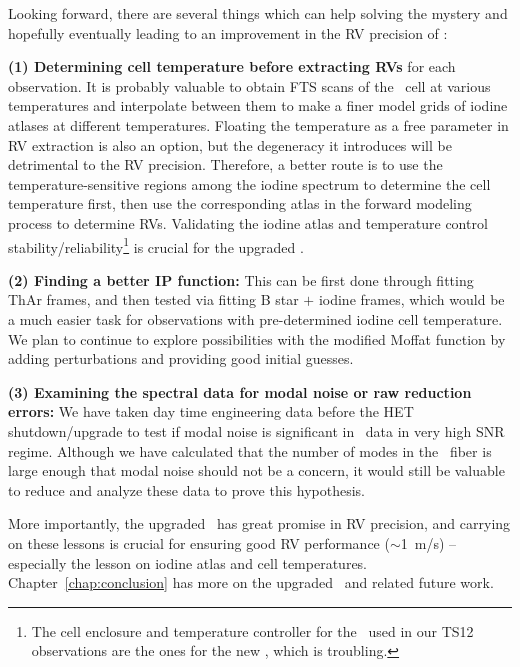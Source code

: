 Looking forward, there are several things which can help solving the
mystery and hopefully eventually leading to an improvement in the RV
precision of \het:

{\bf (1) Determining cell temperature before extracting RVs} for each
observation. It is probably valuable to obtain FTS scans of the \het\
cell at various temperatures and interpolate between them to make a
finer model grids of iodine atlases at different
temperatures. Floating the temperature as a free parameter in RV
extraction is also an option, but the degeneracy it introduces will be
detrimental to the RV precision. Therefore, a better route is to use
the temperature-sensitive regions among the iodine spectrum to
determine the cell temperature first, then use the corresponding atlas
in the forward modeling process to determine RVs. Validating the
iodine atlas and temperature control
stability/reliability\footnote{The cell enclosure and temperature
controller for the \het\ used in our TS12 observations are the ones
for the new \het, which is troubling.} is crucial for the upgraded
\het.

{\bf (2) Finding a better IP function:} This can be first done through
fitting ThAr frames, and then tested via fitting B star $+$ iodine
frames, which would be a much easier task for observations with
pre-determined iodine cell temperature. We plan to continue to explore
possibilities with the modified Moffat function by adding
perturbations and providing good initial guesses.

{\bf (3) Examining the spectral data for modal noise or raw reduction
errors:} We have taken day time engineering data before the HET
shutdown/upgrade to test if modal noise is significant in \het\ data
in very high SNR regime. Although we have calculated that the number
of modes in the \het\ fiber is large enough that modal noise should
not be a concern, it would still be valuable to reduce and analyze
these data to prove this hypothesis.

More importantly, the upgraded \het\ has great promise in RV
precision, and carrying on these lessons is crucial for ensuring good
RV performance ($\sim$1~m/s) -- especially the lesson on iodine atlas
and cell temperatures. Chapter~\ref{chap:conclusion} has more
on the upgraded \het\ and related future work.



